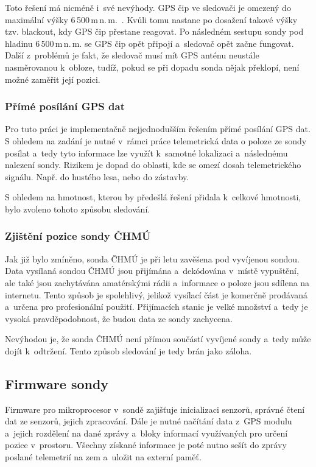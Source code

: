 \documentclass[twoside]{ctuthesis}
\theoremstyle{plain}
\theoremstyle{definition}
\theoremstyle{note}
\begin{document}
				Toto řešení má nicméně i~své nevýhody. GPS čip ve sledovači je omezený do maximální výšky 6\,500\,m\,n.\,m.~\cite{web_spot}. Kvůli tomu nastane po dosažení takové výšky tzv. blackout, kdy GPS čip přestane reagovat. Po následném sestupu sondy pod hladinu 6\,500\,m\,n.\,m. se GPS čip opět připojí a~sledovač opět začne fungovat. Další z~problémů je fakt, že sledovač musí mít GPS anténu neustále nasměrovanou k~obloze, tudíž, pokud se při dopadu sonda nějak překlopí, není možné zaměřit její pozici.

				\subsubsection{Přímé posílání GPS dat}
				Pro tuto práci je implementačně nejjednodušším řešením přímé posílání GPS dat. S ohledem na zadání je nutné v~rámci práce telemetrická data o poloze ze sondy posílat a~tedy tyto informace lze využít k~samotné lokalizaci a~následnému nalezení sondy. Rizikem je dopad do oblasti, kde se omezí dosah telemetrického signálu. Např. do hustého lesa, nebo do zástavby.

				S ohledem na hmotnost, kterou by předešlá řešení přidala k~celkové hmotnosti, bylo zvoleno tohoto způsobu sledování.

				\subsubsection{Zjištění pozice sondy ČHMÚ}
				Jak již bylo zmíněno, sonda ČHMÚ je při letu zavěšena pod vyvíjenou sondou. Data vysílaná sondou ČHMÚ jsou přijímána a~dekódována v~místě vypuštění, ale také jsou zachytávána amatérskými rádii a~informace o poloze jsou sdílena na internetu. Tento způsob je spolehlivý, jelikož vysílací část je komerčně prodávaná a~určena pro profesionální použití. Přijímacích stanic je velké množství a~tedy je vysoká pravděpodobnost, že budou data ze sondy zachycena. 

				Nevýhodou je, že sonda ČHMÚ není přímou součástí vyvíjené sondy a~tedy může dojít k~odtržení. Tento způsob sledování je tedy brán jako záloha.


		
		\subsection{Firmware sondy}
		Firmware pro mikroprocesor v~sondě zajišťuje inicializaci senzorů, správné čtení dat ze senzorů, jejich zpracování. Dále je nutné načítání data z~GPS modulu a~jejich rozdělení na dané zprávy a~bloky informací využívaných pro určení pozice v~prostoru. Všechny získané informace je poté nutno sešít do zprávy poslané telemetrií na zem a~uložit na externí paměť. 
\end{document}
